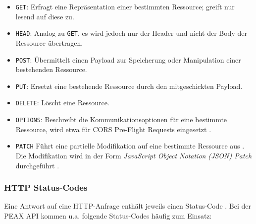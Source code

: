 \begin{itemize}
	\item \texttt{GET}: Erfragt eine Repräsentation einer bestimmten Ressource; greift nur lesend auf diese zu.
    \item \texttt{HEAD}: Analog zu \texttt{GET}, es wird jedoch nur der Header und nicht der Body der Ressource übertragen.
	\item \texttt{POST}: Übermittelt einen Payload zur Speicherung oder Manipulation einer bestehenden Ressource.
	\item \texttt{PUT}: Ersetzt eine bestehende Ressource durch den mitgeschickten Payload.
	\item \texttt{DELETE}: Löscht eine Ressource.
    \item \texttt{OPTIONS}: Beschreibt die Kommunikationsoptionen für eine bestimmte Ressource, wird etwa für CORS Pre-Flight Requests eingesetzt \cite{mdn-cors}.
    \item \texttt{PATCH} Führt eine partielle Modifikation auf eine bestimmte Ressource aus \cite{RFC5789}. Die Modifikation wird in der Form \textit{JavaScript Object Notation (JSON) Patch} durchgeführt \cite{RFC6902}.
\end{itemize}

\subsubsection{HTTP Status-Codes}

Eine Antwort auf eine HTTP-Anfrage enthält jeweils einen Status-Code \cite[Abschnitt 6]{RFC7231}. Bei der PEAX API kommen u.a. folgende Status-Codes häufig zum Einsatz:

